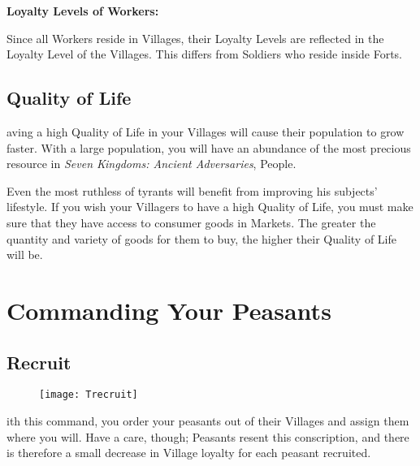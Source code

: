 \textbf{Loyalty Levels of Workers:}

\begin{changemargin}{.5cm}{0cm}
Since all Workers reside in Villages, their Loyalty Levels are reflected in the Loyalty Level of the Villages. This differs from Soldiers who reside inside Forts.
\end{changemargin}

\subsection{Quality of Life}


aving a high Quality of Life in your Villages will cause their population to grow faster. With a large population, you will have an abundance of the most precious resource in \textit{Seven Kingdoms: Ancient Adversaries}, People.

Even the most ruthless of tyrants will benefit from improving his subjects’ lifestyle. If you wish your Villagers to have a high Quality of Life, you must make sure that they have access to consumer goods in Markets. The greater the quantity and variety of goods for them to buy, the higher their Quality of Life will be.

\section{\textsf{Commanding Your Peasants}}


\subsection{\textsf{Recruit}}


\begin{wrapfigure}{r}{0.1\textwidth}
    \vspace{-20pt}
    \begin{center}
        \texttt{[image: Trecruit]}
    \end{center}
    \vspace{-20pt}
\end{wrapfigure}


ith this command, you order your peasants out of their Villages and assign them where you will. Have a care, though; Peasants resent this conscription, and there is therefore a small decrease in Village loyalty for each peasant recruited.

